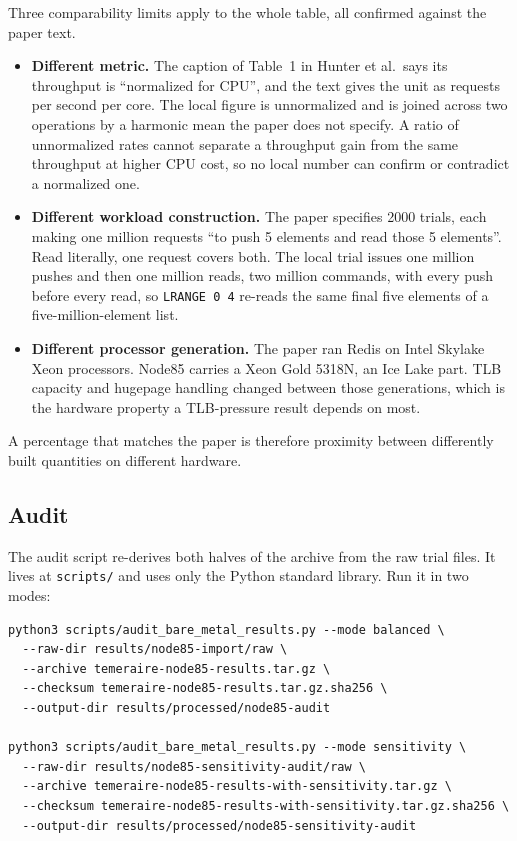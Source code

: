 \documentclass[a4paper,11pt]{article}
\begin{document}
Three comparability limits apply to the whole table, all confirmed against the
paper text.

\begin{itemize}[leftmargin=1.5em]
  \item \textbf{Different metric.} The caption of Table~1 in Hunter et al.\ says
  its throughput is ``normalized for CPU'', and the text gives the unit as
  requests per second per core. The local figure is unnormalized and is joined
  across two operations by a harmonic mean the paper does not specify. A ratio of
  unnormalized rates cannot separate a throughput gain from the same throughput
  at higher CPU cost, so no local number can confirm or contradict a normalized
  one.
  \item \textbf{Different workload construction.} The paper specifies 2000
  trials, each making one million requests ``to push 5 elements and read those 5
  elements''. Read literally, one request covers both. The local trial issues one
  million pushes and then one million reads, two million commands, with every
  push before every read, so \texttt{LRANGE 0 4} re-reads the same final five
  elements of a five-million-element list.
  \item \textbf{Different processor generation.} The paper ran Redis on Intel
  Skylake Xeon processors. Node85 carries a Xeon Gold 5318N, an Ice Lake part.
  TLB capacity and hugepage handling changed between those generations, which is
  the hardware property a TLB-pressure result depends on most.
\end{itemize}

A percentage that matches the paper is therefore proximity between differently
built quantities on different hardware.

\subsection{Audit}

The audit script re-derives both halves of the archive from the raw trial files.
It lives at \texttt{scripts/} and uses only the Python standard library. Run it
in two modes:

\begin{lstlisting}[style=codestyle]
python3 scripts/audit_bare_metal_results.py --mode balanced \
  --raw-dir results/node85-import/raw \
  --archive temeraire-node85-results.tar.gz \
  --checksum temeraire-node85-results.tar.gz.sha256 \
  --output-dir results/processed/node85-audit

python3 scripts/audit_bare_metal_results.py --mode sensitivity \
  --raw-dir results/node85-sensitivity-audit/raw \
  --archive temeraire-node85-results-with-sensitivity.tar.gz \
  --checksum temeraire-node85-results-with-sensitivity.tar.gz.sha256 \
  --output-dir results/processed/node85-sensitivity-audit
\end{lstlisting}
\end{document}
